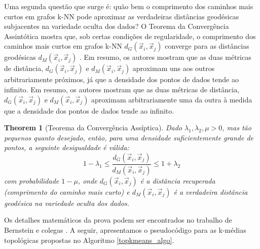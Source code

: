 \documentclass[sn-mathphys,Numbered]{sn-jnl}%
\theoremstyle{thmstyleone}%
\newtheorem{theorem}{Theorem}%
\theoremstyle{thmstyletwo}%
\theoremstyle{thmstylethree}%
\begin{document}
Uma segunda questão que surge é: quão bem o comprimento dos caminhos mais curtos em grafos k-NN pode aproximar as verdadeiras distâncias geodésicas subjacentes na variedade oculta dos dados? O Teorema da Convergência Assintótica mostra que, sob certas condições de regularidade, o comprimento dos caminhos mais curtos em grafos k-NN $d_G(\vec{x}_i, \vec{x}_j)$ converge para as distâncias geodésicas $d_M(\vec {x}_i, \vec{x}_j)$ \cite{NIPS2002}. Em resumo, os autores mostram que as duas métricas de distância, $d_G(\vec{x}_i, \vec{x}_j)$ e $d_M(\vec{x}_i, \vec{x}_j)$ aproximam uns aos outros arbitrariamente próximos, já que a densidade dos pontos de dados tende ao infinito. Em resumo, os autores mostram que as duas métricas de distância, $d_G(\vec{x}_i, \vec{x}_j)$ e $d_M(\vec{x}_i, \vec{x}_j)$ aproximam arbitrariamente uma da outra à medida que a densidade dos pontos de dados tende ao infinito.

\vspace{0.5cm}
\begin{theorem}[Teorema da Convergência Assíptica]
	Dado $\lambda_1, \lambda_2, \mu > 0$, mas tão pequenos quanto desejado, então, para uma densidade suficientemente grande de pontos, a seguinte desigualdade é válida:
	\begin{equation}
		1 - \lambda_1 \leq \frac{d_G(\vec{x}_i,\vec{x}_j)}{d_M(\vec{x}_i,\vec{x}_j)} \leq 1 + \lambda_2
    \end{equation} com probabilidade $1 - \mu$, onde $d_G(\vec{x}_i,\vec{x}_j)$ é a distância recuperada (comprimento do caminho mais curto) e $d_M(\vec{x}_i,\vec{x}_j)$ é a verdadeira distância geodésica na variedade oculta dos dados.
\end{theorem}
\vspace{0.5cm}

Os detalhes matemáticos da prova podem ser encontrados no trabalho de Bernstein e colegas \cite{ACT}. A seguir, apresentamos o pseudocódigo para as k-médias topológicas propostas no Algoritmo \ref{topkmeans_algo}.
\end{document}
